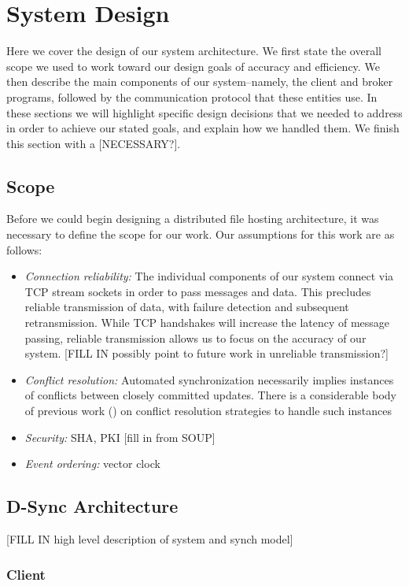 \section{System Design}
\label{design}
Here we cover the design of our system architecture.
We first state the overall scope we used to work toward our design goals of accuracy and efficiency.
We then describe the main components of our system--namely, the client and broker
programs, followed by the communication protocol that these entities use.
In these sections we will highlight specific design decisions that we needed to address
in order to achieve our stated goals,
and explain how we handled them.
We finish this section with a [NECESSARY?].

\subsection{Scope}
Before we could begin designing a distributed file hosting architecture,
it was necessary to define the scope for our work.
Our assumptions for this work are as follows:
\begin{itemize}
    \item \emph{Connection reliability:} The individual components of our system
    connect via TCP stream sockets in order to pass messages and data.
    This precludes reliable transmission of data, with failure detection
    and subsequent retransmission. While TCP handshakes will increase
    the latency of message passing, reliable transmission allows
    us to focus on the accuracy of our system.
    [FILL IN possibly point to future work in unreliable transmission?]
    \item \emph{Conflict resolution:} Automated synchronization necessarily implies
    instances of conflicts between closely committed updates.
    There is a considerable body of previous work (\cite{}) on conflict
    resolution strategies to handle such instances
    \item \emph{Security:} SHA, PKI [fill in from SOUP]
    \item \emph{Event ordering:} vector clock
\end{itemize}

\subsection{D-Sync Architecture}
[FILL IN high level description of system and synch model]
\subsubsection{Client}

